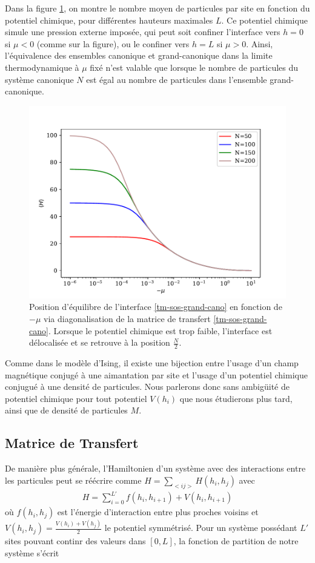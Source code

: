 Dans la figure \ref{hauteur-mu}, on montre le nombre moyen de particules par site en fonction du potentiel chimique, pour différentes hauteurs maximales $L$. Ce potentiel chimique simule une pression externe imposée, qui peut soit confiner l'interface vers $h=0$ si $\mu \less 0$ (comme sur la figure), ou le confiner vers $h=L$ si $\mu \greater 0$. 
Ainsi, l'équivalence des ensembles canonique et grand-canonique dans la limite thermodynamique à $\mu$ fixé n'est valable que lorsque le nombre de particules du système canonique $N$ est égal au nombre de particules dans l'ensemble grand-canonique.
\begin{figure}
    \centering
	\includegraphics[width=0.7\linewidth]{isingtosos/hauteur-tm-sos.pdf}
	\caption{Position d'équilibre de l'interface \ref{tm-sos-grand-cano} en fonction de $- \mu$ via diagonalisation de la matrice de transfert \ref{tm-sos-grand-cano}. Lorsque le potentiel chimique est trop faible, l'interface est délocalisée et se retrouve à la position $\frac{N}{2}$. }
	\label{hauteur-mu}
\end{figure}

Comme dans le modèle d'Ising, il existe une bijection entre l'usage d'un champ magnétique conjugé à une aimantation par site et l'usage d'un potentiel chimique conjugué à une densité de particules. Nous parlerons donc sans ambigüité de potentiel chimique pour tout potentiel $V(h_i)$ que nous étudierons plus tard, ainsi que de densité de particules $M$.
  \subsection{Matrice de Transfert}

	De manière plus générale, l'Hamiltonien d'un système avec des interactions entre les particules peut se réécrire comme $H = \sum_{< ij >} H(h_i,h_j)$ avec
\begin{align*}
  H = \sum_{i=0}^{L'} f(h_i,h_{i+1}) + V(h_i,h_{i+1}) 
\end{align*}
où $f(h_i,h_j)$ est l'énergie d'interaction entre plus proches voisins et $V(h_i,h_j)=\frac{V(h_i)+V(h_j)}{2}$ le potentiel symmétrisé. Pour un système possédant $L'$ sites pouvant continr des valeurs dans $[0,L]$, la fonction de partition de notre système s'écrit 

